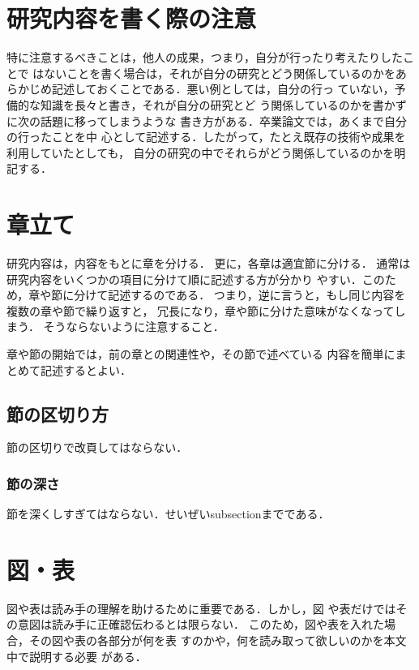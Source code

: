 \documentclass[11pt,master]{oecu-thesis}
\begin{document}
\section{研究内容を書く際の注意}

特に注意するべきことは，他人の成果，つまり，自分が行ったり考えたりしたことで
はないことを書く場合は，それが自分の研究とどう関係しているのかをあ
らかじめ記述しておくことである．悪い例としては，自分の行っ
ていない，予備的な知識を長々と書き，それが自分の研究とど
う関係しているのかを書かずに次の話題に移ってしまうような
書き方がある．卒業論文では，あくまで自分の行ったことを中
心として記述する．したがって，たとえ既存の技術や成果を利用していたとしても，
自分の研究の中でそれらがどう関係しているのかを明記する．

\section{章立て}

研究内容は，内容をもとに章を分ける．
更に，各章は適宜節に分ける．
通常は研究内容をいくつかの項目に分けて順に記述する方が分かり
やすい．このため，章や節に分けて記述するのである．
つまり，逆に言うと，もし同じ内容を複数の章や節で繰り返すと，
冗長になり，章や節に分けた意味がなくなってしまう．
そうならないように注意すること．

章や節の開始では，前の章との関連性や，その節で述べている
内容を簡単にまとめて記述するとよい．

\subsection{節の区切り方}

節の区切りで改頁してはならない．

\subsubsection{節の深さ}

節を深くしすぎてはならない．せいぜいsubsectionまでである．

\section{図・表}

図や表は読み手の理解を助けるために重要である．しかし，図
や表だけではその意図は読み手に正確認伝わるとは限らない．
このため，図や表を入れた場合，その図や表の各部分が何を表
すのかや，何を読み取って欲しいのかを本文中で説明する必要
がある．
\end{document}
